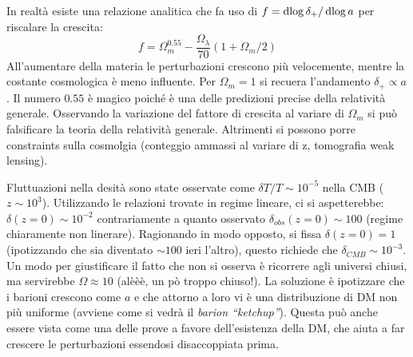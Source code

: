 In realtà esiste una relazione analitica che fa uso di $f=\operatorname{d}\!{\log \delta_+} / \operatorname{d}\!{\log a}$ per riscalare la crescita:
\begin{equation*}
    f=\Omega_m^{0.55} - \frac{\Omega_\lambda}{70} (1+\Omega_m /2)
\end{equation*}
All'aumentare della materia le perturbazioni crescono più velocemente, mentre la costante cosmologica è meno influente. Per $\Omega_m=1$ si recuera l'andamento $\delta_+ \propto a$. Il numero $0.55$ è magico poiché è una delle predizioni precise della relatività generale. Osservando la variazione del fattore di crescita al variare di $\Omega_m$ si può falsificare la teoria della relatività generale. Altrimenti si possono porre constraints sulla cosmolgia (conteggio ammassi al variare di z, tomografia weak lensing).

\vspace{1em}
Fluttuazioni nella desità sono state osservate come $\delta T /T \sim 10^{-5}$ nella CMB ($z\sim 10^3$). Utilizzando le relazioni trovate in regime lineare, ci si aspetterebbe: $\delta (z=0) \sim 10^{-2}$ contrariamente a quanto osservato $\delta_{obs} (z=0)\sim 100$ (regime chiaramente non linerare). Ragionando in modo opposto, si fissa $\delta (z=0) = 1 $ (ipotizzando che sia diventato $\sim 100$ ieri l'altro), questo richiede che $\delta_{CMB}\sim 10^{-3}$. Un modo per giustificare il fatto che non si osserva è ricorrere agli universi chiusi, ma servirebbe $\Omega \approx 10$ (alèèè, un pò troppo chiuso!). La soluzione è ipotizzare che i barioni crescono come $a$ e che attorno a loro vi è una distribuzione di DM non più uniforme (avviene come si vedrà il \textit{barion ``ketchup''}). Questa può anche essere vista come una delle prove a favore dell'esistenza della DM, che aiuta a far crescere le perturbazioni essendosi disaccoppiata prima.
\vspace{1em}


